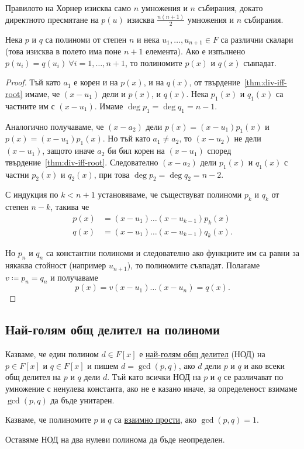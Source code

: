 \documentclass[numbers=endperiod, DIV=15, bibliography=totocnumbered]{scrartcl}
\begin{document}
Правилото на Хорнер изисква само $n$ умножения и $n$ събирания, докато директното пресмятане на $p(u)$ изисква $\frac {n(n+1)} 2$ умножения и $n$ събирания.

\begin{theorem}\label{thm:coeff-principle}
  Нека $p$ и $q$ са полиноми от степен $n$ и нека $u_1, \ldots, u_{n+1} \in F$ са различни скалари (това изисква в полето има поне $n+1$ елемента). Ако е изпълнено $p(u_i) = q(u_i)~\forall i = 1, \ldots, n + 1$, то полиномите $p(x)$ и $q(x)$ съвпадат.
\end{theorem}
\begin{proof}
  Тъй като $a_1$ е корен и на $p(x)$, и на $q(x)$, от твърдение~\ref{thm:div-iff-root} имаме, че $(x - u_1)$ дели и $p(x)$, и $q(x)$. Нека $p_1(x)$ и $q_1(x)$ са частните им с $(x - u_1)$. Имаме $\deg p_1 = \deg q_1 = n - 1$.

  Аналогично получаваме, че $(x - a_2)$ дели $p(x) = (x - u_1) p_1(x)$ и $p(x) = (x - u_1) p_1(x)$. Но тъй като $a_1 \neq a_2$, то $(x - u_2)$ не дели $(x - u_1)$, защото иначе $a_2$ би бил корен на $(x - u_1)$ според твърдение~\ref{thm:div-iff-root}. Следователно $(x - a_2)$ дели $p_1(x)$ и $q_1(x)$ с частни $p_2(x)$ и $q_2(x)$, при това $\deg p_2 = \deg q_2 = n - 2$.

  С индукция по $k < n + 1$ установяваме, че съществуват полиноми $p_k$ и $q_k$ от степен $n - k$, такива че
  \begin{align*}
    p(x) &= (x - u_1) \ldots (x - u_{k-1}) p_k(x) \\
    q(x) &= (x - u_1) \ldots (x - u_{k-1}) q_k(x).
  \end{align*}

  Но $p_n$ и $q_n$ са константни полиноми и следователно ако функциите им са равни за някаква стойност (например $u_{n+1}$), то полиномите съвпадат. Полагаме $v \coloneqq p_n = q_n$ и получаваме
  \begin{displaymath}
    p(x) = v (x - u_1) \ldots (x - u_n) = q(x).
  \end{displaymath}
\end{proof}

\subsection{Най-голям общ делител на полиноми}

\begin{definition}
  Казваме, че един полином $d \in F[x]$ е \uline{най-голям общ делител} (НОД) на $p \in F[x]$ и $q \in F[x]$ и пишем $d = \gcd(p, q)$, ако $d$ дели $p$ и $q$ и ако всеки общ делител на $p$ и $q$ дели $d$. Тъй като всички НОД на $p$ и $q$ се различават по умножение с ненулева константа, ако не е казано иначе, за определеност взимаме $\gcd(p, q)$ да бъде унитарен.

  Казваме, че полиномите $p$ и $q$ са \uline{взаимно прости}, ако $\gcd(p, q) = 1$.

  Оставяме НОД на два нулеви полинома да бъде неопределен.
\end{definition}
\end{document}
